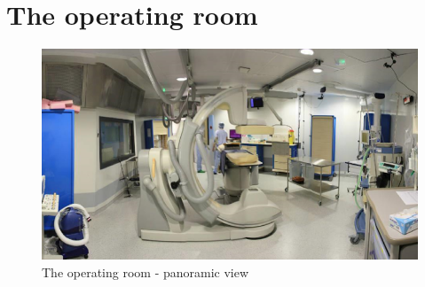 
\chapter{The operating room} %

\label{AppendixA} %



\begin{figure}[here]
\centering
\includegraphics[width=1.0\textwidth]{Figures/CArmRoomPanaromic}
\caption{The operating room - panoramic view}
\label{fig:theOperatingRoom}
\end{figure}